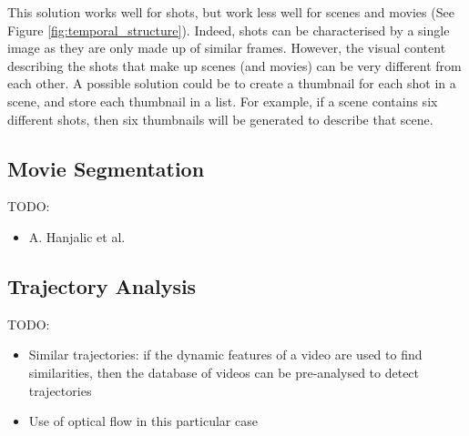 \documentclass[11pt,openany,a4paper]{article}
\begin{document}
This solution works well for shots, but work less well for scenes and movies (See Figure \ref{fig:temporal_structure}). Indeed, shots can be characterised by a single image as they are only made up of similar frames. However, the visual content describing the shots that make up scenes (and movies) can be very different from each other. A possible solution could be to create a thumbnail for each shot in a scene, and store each thumbnail in a list. For example, if a scene contains six different shots, then six thumbnails will be generated to describe that scene.\\

\subsection{Movie Segmentation}
\label{sec:movie-segmentation}

TODO:
\begin{itemize}
    \item A. Hanjalic et al. \cite{hanjalic1999moviesegmentation}
\end{itemize}


\subsection{Trajectory Analysis}
\label{sec:trajectory-analysis}

TODO:
\begin{itemize}
    \item Similar trajectories: if the dynamic features of a video are used to find similarities, then the database of videos can be pre-analysed to detect trajectories \cite{lai2015trajectory}
    \item Use of optical flow in this particular case
\end{itemize}



\clearpage


\end{document}

